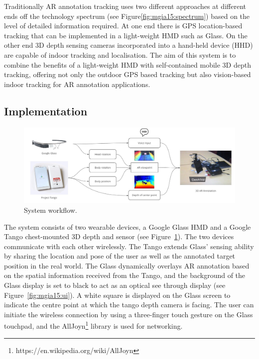 Traditionally AR annotation tracking uses two different approaches at different ends off the technology spectrum (see Figure\ref{fig:mgia15:spectrum}) based on the level of detailed information required. At one end there is GPS location-based tracking that can be implemented in a light-weight HMD such as Glass. On the other end 3D depth sensing cameras incorporated into a hand-held device (HHD) are capable of indoor tracking and localisation. The aim of this system is to combine the benefits of a light-weight HMD with self-contained mobile 3D depth tracking, offering not only the outdoor GPS based tracking but also vision-based indoor tracking for AR annotation applications. 

\subsection{Implementation}

\begin{figure}
  \centering
  \includegraphics[width=\linewidth]{images/mgia15/mgia2015-system.jpg}
  \caption{System workflow.}
  \label{framework}
\end{figure}

The system consists of two wearable devices, a Google Glass HMD and a Google Tango chest-mounted 3D depth and sensor (see Figure~\ref{framework}). The two devices communicate with each other wirelessly. The Tango extends Glass' sensing ability by sharing the location and pose of the user as well as the annotated target position in the real world. The Glass dynamically overlays AR annotation based on the spatial information received from the Tango, and the background of the Glass display is set to black to act as an optical see through display (see Figure~\ref{fig:mgia15:ui}). A white square is displayed on the Glass screen to indicate the centre point at which the tango depth camera is facing. The user can initiate the wireless connection by using a three-finger touch gesture on the Glass touchpad, and the AllJoyn\footnote{https://en.wikipedia.org/wiki/AllJoyn} library  is used for networking.


